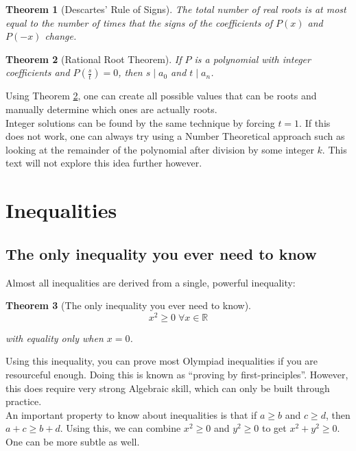 \documentclass[a4paper,12pt]{article}
\newtheorem{theorem}{Theorem}[section]
\begin{document}
\begin{theorem}[Descartes' Rule of Signs]
The total number of real roots is at most equal to the number of times that the signs of the coefficients of $P(x)$ and $P(-x)$ change.\\
\end{theorem}

\begin{theorem}[Rational Root Theorem] 
    \label{rationalrootthm}
    If $P$ is a polynomial with integer coefficients and $P(\frac{s}{t}) = 0$, then $s\; |\; a_0$ and $t\; |\; a_n$.\\
\end{theorem}

Using Theorem \ref{rationalrootthm}, one can create all possible values that can be roots and manually determine which ones are actually roots.\\
Integer solutions can be found by the same technique by forcing $t = 1$. If this does not work, one can always try using a Number Theoretical approach such as looking at the remainder of the polynomial after division by some integer $k$. This text will not explore this idea further however.

\clearpage

\section{Inequalities}

\subsection{The only inequality you ever need to know}
Almost all inequalities are derived from a single, powerful inequality:
\begin{theorem}[The only inequality you ever need to know]
$$x^2 \geq 0\; \forall x \in \mathbb{R}$$

with equality only when $x = 0$.
\end{theorem}
Using this inequality, you can prove most Olympiad inequalities if you are resourceful enough.
Doing this is known as ``proving by first-principles''. However, this does require very strong Algebraic skill, which can only be built through practice.\\

An important property to know about inequalities is that if $a \geq b$ and $c \geq d$, then $a + c \geq b + d$. Using this, we can combine $x^2 \geq 0$ and $y^2 \geq 0$ to get $x^2 + y^2 \geq 0$. One can be more subtle as well. 
\end{document}
